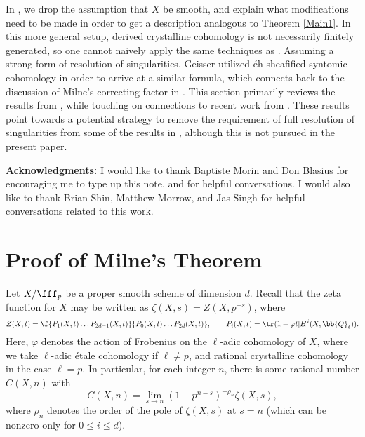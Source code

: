 In , we drop the assumption that $X$ be smooth, and explain what modifications need to be made in order to get a description analogous to Theorem \ref{Main1}.  In this more general setup, derived crystalline cohomology is not necessarily finitely generated, so one cannot naively apply the same techniques as .  Assuming a strong form of resolution of singularities, Geisser \cite{geisser2005arithmetic} utilized \'{e}h-sheafified syntomic cohomology in order to arrive at a similar formula, which connects back to the discussion of Milne's correcting factor in \cite{morinmilnes2}.  This section primarily reviews the results from \cite{geisser2005arithmetic}, while touching on connections to recent work from \cite{elmanto2023motivic}.  These results point towards a potential strategy to remove the requirement of full resolution of singularities from some of the results in \cite{geisser2005arithmetic}, although this is not pursued in the present paper.




\textbf{Acknowledgments:} I would like to thank Baptiste Morin and Don Blasius for encouraging me to type up this note, and for helpful conversations.  I would also like to thank Brian Shin, Matthew Morrow, and Jas Singh for helpful conversations related to this work.


\newpage
	\section{Proof of Milne's Theorem}
\indent \indent Let $X/\fff_p$ be a proper smooth scheme of dimension $d$.  Recall that the zeta function for $X$ may be written as $\zeta(X,s)=Z(X,p^{-s})$, where $$Z(X,t)=\f{P_1(X,t)\ldots P_{2d-1}(X,t)}{P_0(X,t)\ldots P_{2d}(X,t)}, \qquad P_i(X,t)=\tr(1-\varphi t|H^i(X,\bb{Q}_{\ell})).$$  Here, $\varphi$ denotes the action of Frobenius on the $\ell$-adic cohomology of $X$, where we take $\ell$-adic \'{e}tale cohomology if $\ell\neq p$, and rational crystalline cohomology in the case $\ell=p$.  In particular, for each integer $n$, there is some rational number $C(X,n)$ with $$C(X,n)=\lim_{s\to n}(1-p^{n-s})^{-\rho_n}\zeta(X,s),$$ where $\rho_n$ denotes the order of the pole of $\zeta(X,s)$ at $s=n$ (which can be nonzero only for $0\leq i\leq d$).

